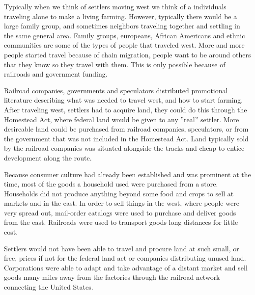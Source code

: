 Typically when we think of settlers moving west we think of a individuals traveling alone to make a living farming. 
However, typically there would be a large family group, and sometimes neighbors traveling together and settling in the same general area.
Family groups, europeans, African Americans and ethnic communities are some of the types of people that traveled west.
More and more people started travel because of chain migration, people want to be around others that they know so they travel with them.
This is only possible because of railroads and government funding.

Railroad companies, governments and speculators distributed promotional literature describing what was needed to travel west, and how to start farming.
After traveling west, settlers had to acquire land, they could do this through the Homestead Act, where federal land would be given to any ''real'' settler.
More desireable land could be purchased from railroad companies, speculators, or from the government that was not included in the Homestead Act.
Land typically sold by the railroad companies was situated alongside the tracks and cheap to entice development along the route.

Because consumer culture had already been established and was prominent at the time, most of the goods a household used were purchased from a store.
Households did not produce anything beyond some food and crops to sell at markets and in the east.
In order to sell things in the west, where people were very spread out, mail-order catalogs were used to purchase and deliver goods from the east.
Railroads were used to transport goods long distances for little cost.


Settlers would not have been able to travel and procure land at such small, or free, prices if not for the federal land act or companies distributing unused land. 
Corporations were able to adapt and take advantage of a distant market and sell goods many miles away from the factories through the railroad network connecting the United States.